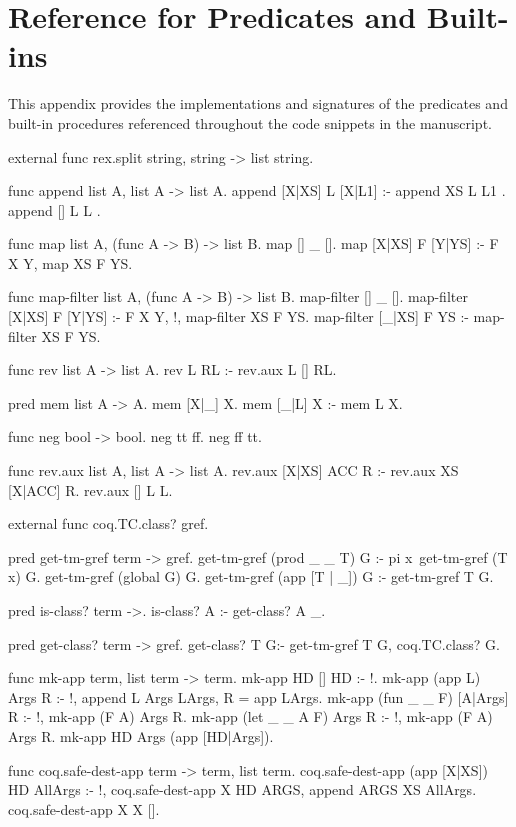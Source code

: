 \chapter{Reference for \elpi{} Predicates and Built-ins}
\label{app:builtins}

This appendix provides the implementations and signatures of the \elpi{}
predicates and built-in procedures referenced throughout the code snippets in
the manuscript.

\begin{elpicode}
  external func rex.split string, string -> list string.

  func append list A, list A -> list A.
  append [X|XS] L [X|L1] :- append XS L L1 .
  append [] L L .

  func map list A, (func A -> B) -> list B.
  map [] _ [].
  map [X|XS] F [Y|YS] :- F X Y, map XS F YS.

  func map-filter list A, (func A -> B) -> list B.
  map-filter [] _ [].
  map-filter [X|XS] F [Y|YS] :- F X Y, !, map-filter XS F YS.
  map-filter [_|XS] F YS :- map-filter XS F YS.

  func rev list A -> list A.
  rev L RL  :- rev.aux L []  RL.

  pred mem list A -> A.
  mem [X|_] X.
  mem [_|L] X :- mem L X.

  func neg bool -> bool.
  neg tt ff.
  neg ff tt.

  func rev.aux list A, list A -> list A.
  rev.aux [X|XS] ACC R :- rev.aux XS [X|ACC] R.
  rev.aux [] L L.

  external func coq.TC.class? gref.

  pred get-tm-gref term -> gref.
  get-tm-gref (prod _ _ T) G :- pi x\ get-tm-gref (T x) G.
  get-tm-gref (global G) G.
  get-tm-gref (app [T | _]) G :- get-tm-gref T G.

  pred is-class? term ->.
  is-class? A :- get-class? A _.

  pred get-class? term -> gref.
  get-class? T G:- get-tm-gref T G, coq.TC.class? G.

  func mk-app term, list term -> term.
  mk-app HD [] HD :- !.
  mk-app (app L) Args R :- !, append L Args LArgs, R = app LArgs.
  mk-app (fun _ _ F) [A|Args] R :- !, mk-app (F A) Args R.
  mk-app (let _ _ A F) Args R :- !, mk-app (F A) Args R.
  mk-app HD Args (app [HD|Args]).

  func coq.safe-dest-app term -> term, list term.
  coq.safe-dest-app (app [X|XS]) HD AllArgs :- !,
    coq.safe-dest-app X HD ARGS, append ARGS XS AllArgs.
  coq.safe-dest-app X X [].
\end{elpicode}